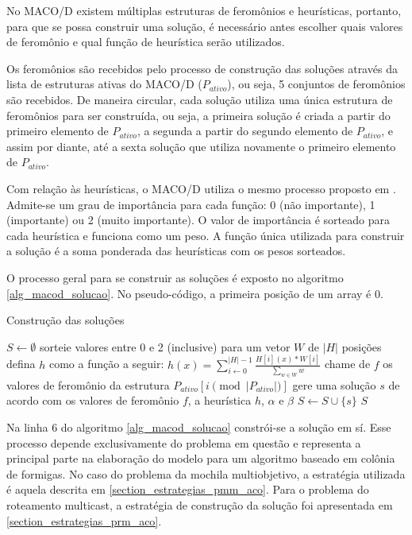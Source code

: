 No MACO/D existem múltiplas estruturas de feromônios e heurísticas, portanto, para que se possa construir uma solução, é necessário antes escolher quais valores de feromônio e qual função de heurística serão utilizados. 

Os feromônios são recebidos pelo processo de construção das soluções através da lista de estruturas ativas do MACO/D ($P_{ativo}$), ou seja, 5 conjuntos de feromônios são recebidos. De maneira circular, cada solução utiliza uma única estrutura de feromônios para ser construída, ou seja, a primeira solução é criada a partir do primeiro elemento de $P_{ativo}$, a segunda a partir do segundo elemento de $P_{ativo}$, e assim por diante, até a sexta solução que utiliza novamente o primeiro elemento de $P_{ativo}$.

Com relação às heurísticas, o MACO/D utiliza o mesmo processo proposto em \cite{Riveros2016}. Admite-se um grau de importância para cada função: 0 (não importante), 1 (importante) ou 2 (muito importante). O valor de importância é sorteado para cada heurística e funciona como um peso. A função única utilizada para construir a solução é a soma ponderada das heurísticas com os pesos sorteados.

O processo geral para se construir as soluções é exposto no algoritmo \ref{alg_macod_solucao}. No pseudo-código, a primeira posição de um array é 0.

\begin{algorithm}
	\caption{Construção das soluções}
	\label{alg_macod_solucao}
	\begin{algorithmic}[1]
		\State $S \gets \emptyset$
			\State sorteie valores entre 0 e 2 (inclusive) para um vetor $W$ de $|H|$ posições
			\State defina $h$ como a função a seguir: $h(x) = \sum_{i \gets 0}^{|H|-1}\frac{H[i](x) * W[i]}{\sum\limits_{w \in W}w}$
			\State chame de $f$ os valores de feromônio da estrutura $P_{ativo}[i \pmod{|P_{ativo}|}]$
			\State gere uma solução $s$ de acordo com os valores de feromônio $f$, a heurística $h$, $\alpha$ e $\beta$
			\State $S \gets S \cup \{s\}$
		\EndFor
		\State \Return $S$
	\end{algorithmic}
\end{algorithm}

Na linha 6 do algoritmo \ref{alg_macod_solucao} constrói-se a solução em sí. Esse processo depende exclusivamente do problema em questão e representa a principal parte na elaboração do modelo para um algoritmo baseado em colônia de formigas. No caso do problema da mochila multiobjetivo, a estratégia utilizada é aquela descrita em \ref{section_estrategias_pmm_aco}. Para o problema do roteamento multicast, a estratégia de construção da solução foi apresentada em \ref{section_estrategias_prm_aco}.

